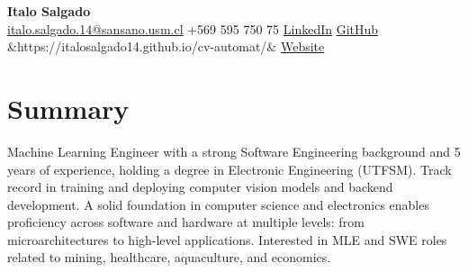 \documentclass[11pt, letterpaper]{article}
\newcommand{\cvperson}[6]{%
  \begin{center}
    {\LARGE\bfseries\color{accent} #1}\\[4pt]
    {\small
      \href{mailto:#2}{#2}
      \enspace\textbar\enspace
      #3
      \enspace\textbar\enspace
      \href{#4}{LinkedIn}
      \enspace\textbar\enspace
      \href{#5}{GitHub}%
      \ifx&#6&\else
        \enspace\textbar\enspace\href{#6}{Website}%
      \fi
    }
  \end{center}
}
\begin{document}
\cvperson
  {Italo Salgado}
  {italo.salgado.14@sansano.usm.cl}
  {+569 595 750 75}
  {https://www.linkedin.com/in/italo-salgado-910764192/}
  {https://github.com/italosalgado14}
  {https://italosalgado14.github.io/cv-automat/}
\section{Summary}
Machine Learning Engineer with a strong Software Engineering background and 5 years of experience,
holding a degree in Electronic Engineering (UTFSM).
Track record in training and deploying computer vision models and backend development.
A solid foundation in computer science and electronics enables proficiency across software and
hardware at multiple levels: from microarchitectures to high-level applications.
Interested in MLE and SWE roles related to mining, healthcare, aquaculture, and economics.
\end{document}
